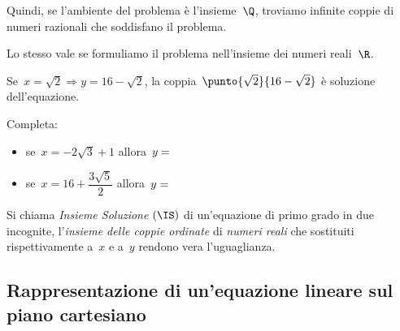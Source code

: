\begin{soluzione}
Quindi, se l'ambiente del problema è
l'insieme~\(\Q\), troviamo infinite coppie di
numeri razionali che soddisfano il problema.

Lo stesso vale se formuliamo il problema nell'insieme dei
numeri reali~\(\R\).

Se~\(x=\sqrt{2}\Rightarrow y=16-\sqrt{2}\), la 
coppia~\(\punto{\sqrt{2}}{16-\sqrt{2}}\) è soluzione
dell'equazione. 


Completa:

\begin{itemize} [nosep]
\item se~\(x=-2\sqrt{3}+1\) allora~\(y=\dotfill\)
\item se~\(x=16+\dfrac{3\sqrt{5}}{2}\) allora~\(y=\dotfill\)
\end{itemize}
\end{soluzione}

\begin{definizione}
Si chiama \emph{Insieme Soluzione} \((\IS)\) di un'equazione di primo
grado in due incognite, l'\emph{insieme delle coppie
ordinate} di \emph{numeri reali} che sostituiti rispettivamente a~\(x\) e
a~\(y\) rendono vera l'uguaglianza.
\end{definizione}


\subsection{Rappresentazione di un'equazione lineare sul piano cartesiano}

